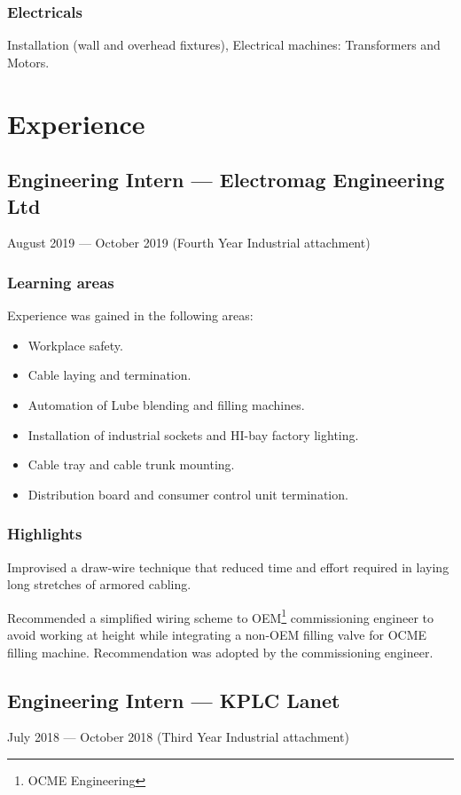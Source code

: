 \documentclass[a4paper]{article}
\begin{document}
\subsubsection{Electricals}
Installation (wall and overhead fixtures), Electrical machines: Transformers and Motors.

\section{Experience}
\subsection{Engineering Intern --- Electromag Engineering Ltd}
August 2019 --- October 2019 (Fourth Year Industrial attachment)
\subsubsection{Learning areas}
Experience was gained in the following areas:
\begin{itemize}
	\item Workplace safety.
	\item Cable laying and termination.
	\item Automation of Lube blending and filling machines.
	\item Installation of industrial sockets and HI-bay factory lighting.
	\item Cable tray and cable trunk mounting.
	\item Distribution board and consumer control unit termination.
\end{itemize}
\subsubsection{Highlights}
Improvised a draw-wire technique that reduced time and effort required in laying long stretches of armored cabling.

Recommended a simplified wiring scheme to OEM\footnote{OCME Engineering} commissioning engineer to avoid working at height while integrating a non-OEM filling valve for OCME filling machine. Recommendation was adopted by the commissioning engineer.

\subsection{Engineering Intern --- KPLC Lanet}
July 2018 --- October 2018 (Third Year Industrial attachment)
\end{document}
